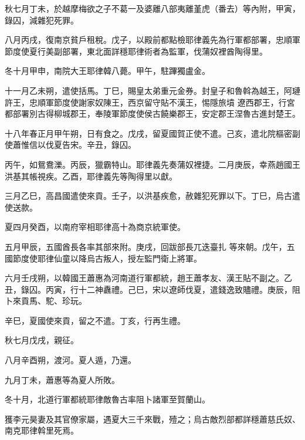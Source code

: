 \begin{pinyinscope}
 秋七月丁未，於越摩梅欲之子不葛一及婆離八部夷離堇虎（番去）等內附，甲寅，錄囚，減雜犯死罪。



 八月丙戌，復南京貧戶租稅。戊子，以殿前都點檢耶律義先為行軍都部署，忠順軍節度使夏行美副部署，東北面詳穩耶律術者為監軍，伐蒲奴裡酋陶得里。



 冬十月甲申，南院大王耶律韓八薨。甲午，駐蹕獨盧金。



 十一月乙未朔，遣使括馬。丁巳，賜皇太弟重元金券。封皇子和魯斡為越王，阿璉許王，忠順軍節度使謝家奴陳王，西京留守貼不漢王，惕隱旅墳
 遼西郡王，行宮都部署別古得柳城郡王，奉陵軍節度使侯古饒樂郡王，安定郡王涅魯古進封楚王。



 十八年春正月甲午朔，日有食之。戊戌，留夏國賀正使不遣。己亥，遣北院樞密副使蕭惟信以伐夏告宋。辛丑，錄囚。



 丙午，如鴛鴦濼。丙辰，獵霸特山。耶律義先奏蒲奴裡捷。二月庚辰，幸燕趙國王洪基其帳視疾。乙酉，耶律義先等陶得里以獻。



 三月乙巳，高昌國遣使來貢。壬子，以洪基疾愈，赦雜犯死罪以下。丁巳，烏古遣使送款。



 夏四月癸酉，以南府宰相耶律高十為商京統軍使。



 五月甲辰，五國酋長各率其部來附。庚戌，回跋部長兀迭臺扎
 等來朝。戊午，五國節度使耶律仙童以降烏古叛人，授左監門衛上將軍。



 六月壬戌朔，以韓國王蕭惠為河南道行軍都統，趙王蕭孝友、漢王貼不副之。乙丑，錄囚。丙寅，行十二神纛禮。己巳，宋以遼師伐夏，遣錢逸致贐禮。庚辰，阻卜來貢馬、駝、珍玩。



 辛巳，夏國使來貢，留之不遣。丁亥，行再生禮。



 秋七月戊戌，親征。



 八月辛酉朔，渡河。夏人遁，乃還。



 九月丁未，蕭惠等為夏人所敗。



 冬十月，北道行軍都統耶律敵魯古率阻卜諸軍至賀蘭山。



 獲李元昊妻及其官僚家屬，遇夏大三千來戰，殪之；烏古敵烈部都詳穩蕭慈氏奴、南克耶律斡里死焉。




\end{pinyinscope}
